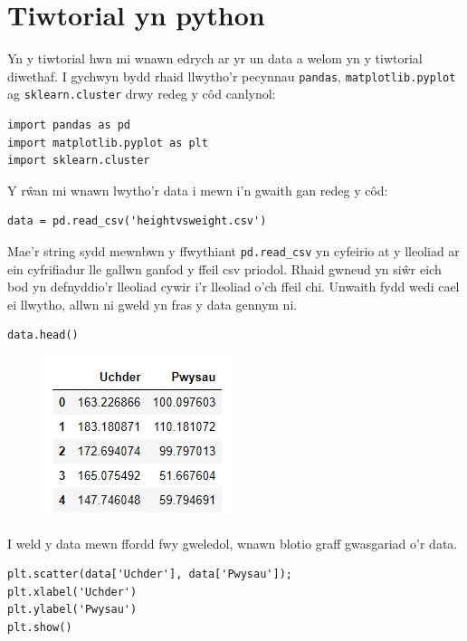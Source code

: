 \section{Tiwtorial yn python}
Yn y tiwtorial hwn mi wnawn edrych ar yr un data a welom yn y tiwtorial diwethaf.
I gychwyn bydd rhaid llwytho'r pecynnau \texttt{pandas}, \texttt{matplotlib.pyplot} ag \texttt{sklearn.cluster} drwy redeg y c\^{o}d canlynol:

\begin{verbatim}
import pandas as pd
import matplotlib.pyplot as plt
import sklearn.cluster
\end{verbatim}

Y r\^{w}an mi wnawn lwytho'r data i mewn i'n gwaith gan redeg y c\^{o}d:

\begin{verbatim}
data = pd.read_csv('heightvsweight.csv')
\end{verbatim}

Mae'r string sydd mewnbwn y ffwythiant \texttt{pd.read_csv} yn cyfeirio at y lleoliad ar ein cyfrifiadur lle gallwn ganfod y ffeil csv priodol. Rhaid gwneud yn si\^{w}r eich bod yn defnyddio'r lleoliad cywir i'r lleoliad o'ch ffeil chi.
Unwaith fydd wedi cael ei llwytho, allwn ni gweld yn fras y data gennym ni. 

\begin{verbatim}
data.head()
\end{verbatim}

\begin{figure}[H]
\begin{center}
\includegraphics[width=0.35\linewidth]{../img/tabl1.jpg}
\end{center}
\label{fig:Data1}
\end{figure}

I weld y data mewn ffordd fwy gweledol, wnawn blotio graff gwasgariad o'r data.

\begin{verbatim}
plt.scatter(data['Uchder'], data['Pwysau']);
plt.xlabel('Uchder')
plt.ylabel('Pwysau')
plt.show()
\end{verbatim}

